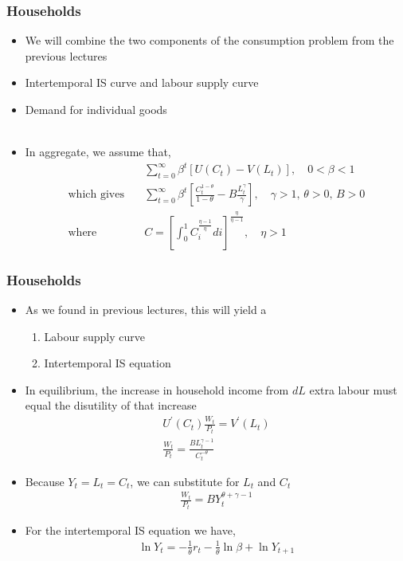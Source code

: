 \documentclass[10pt, xcolor=x11names, table]{beamer}
\begin{document}
\begin{frame}
\frametitle{Households}
\begin{itemize}
\item We will combine the two components of the consumption problem from the previous lectures
\item Intertemporal IS curve and labour supply curve %
\item Demand for individual goods \\~\\ 
\item In aggregate, we assume that,
\begin{align*}
&\sum_{t=0}^{\infty}\beta^{t}\left[U(C_{t}) -  V(L_{t})\right], \quad 0<\beta<1 \\
\text{which gives} \quad &\sum_{t=0}^{\infty}\beta^{t}\left[\frac{C_{t}^{1-\theta}}{1-\theta} -  B\frac{L_{t}^{\gamma}}{\gamma}\right], \quad \gamma>1,\,\theta>0,\, B>0 \\
\text{where} \quad &C = \left[\int^{1}_{0} C_{i}^{\frac{\eta-1}{\eta}}di\right]^{\frac{\eta}{\eta-1}}, \quad \eta>1
\end{align*}
\end{itemize}
\end{frame}

\begin{frame}
\frametitle{Households}
\small
\begin{itemize}
\item As we found in previous lectures, this will yield a
\begin{enumerate}
\item Labour supply curve
\item Intertemporal IS equation
\end{enumerate}
\item In equilibrium, the increase in household income from $dL$ extra labour must equal the disutility of that increase
\begin{align*}
U^{\prime}(C_{t})\frac{W_{t}}{P_{t}} =  V^{\prime}(L_{t}) \\
\frac{W_{t}}{P_{t}} = \frac{BL^{\gamma-1}_{t}}{C_{t}^{-\theta}}
\end{align*}
\item Because $Y_{t} = L_{t} = C_{t}$, we can substitute for $L_{t}$ and $C_{t}$
\begin{align}
\frac{W_{t}}{P_{t}} = {BY_{t}^{\theta + \gamma-1}}
\end{align}
\item For the intertemporal IS equation we have,
\begin{align}
\ln{Y_{t}} = -\frac{1}{\theta}r_{t} -\frac{1}{\theta}\ln{\beta} + {\ln}{Y_{t+1}}
\end{align}
\end{itemize}
\end{frame}
\end{document}
